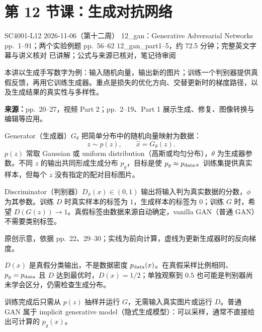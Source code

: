 
\section{第 12 节课：生成对抗网络}
\label{lecture:SC4001-L12}

\lecturemeta
  {SC4001-L12}
  {2026-11-06（第十二周）}
  {12\_gan：Generative Adversarial Networks}
  {pp.~1--91；两个实验例题 pp.~56--62}
  {12\_gan\_part1--5，约 72.5 分钟；完整英文字幕与讲义核对}
  {已讲解；公式与来源已核对，笔记待审阅}

本讲以生成手写数字为例：输入随机向量，输出新的图片；训练一个判别器提供真假反馈，再用它训练生成器。重点是损失的优化方向、交替更新时的梯度路径，以及生成结果的真实性与多样性。


\textbf{来源：}pp.~20--27，视频 Part 2；pp.~2--19、Part 1 展示生成、修复、图像转换与编辑等应用。

Generator（生成器）$G_\theta$ 把简单分布中的随机向量映射为数据：
\[
 z\sim p(z),\qquad \hat x=G_\theta(z).
\]
$p(z)$ 常取 Gaussian 或 uniform distribution（高斯或均匀分布），$\theta$ 为生成器参数。不同 $z$ 的输出共同形成生成分布 $p_g$，目标是使 $p_g\approx p_{\rm data}$。训练集提供真实样本，但每个 $z$ 没有指定的配对目标图片。

Discriminator（判别器）$D_\phi(x)\in(0,1)$ 输出将输入判为真实数据的分数，$\phi$ 为其参数。训练 $D$ 时真实样本的标签为 $1$，生成样本的标签为 $0$；训练 $G$ 时，希望 $D(G(z))\to1$。真假标签由数据来源自动确定，vanilla GAN（普通 GAN）不需要类别标签。

\begin{center}

\end{center}
{\small 原创示意，依据 pp.~22、29--30；实线为前向计算，虚线为更新生成器时的反向梯度。}

$D(x)$ 是真假分类输出，不是数据密度 $p_{\rm data}(x)$。在真假采样比例相同、$p_g=p_{\rm data}$ 且 $D$ 达到最优时，$D(x)=1/2$；单独观察到 $0.5$ 也可能是判别器尚未学会区分，仍需检查生成分布。

训练完成后只需从 $p(z)$ 抽样并运行 $G$，无需输入真实图片或运行 $D$。普通 GAN 属于 implicit generative model（隐式生成模型）：可以采样，通常不直接给出可计算的 $p_g(x)$。


